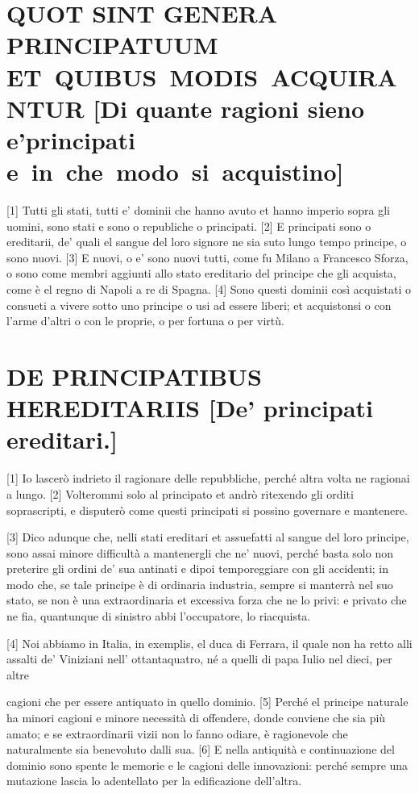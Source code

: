 \setcounter{secnumdepth}{2}

\quebra\section{QUOT SINT GENERA PRINCIPATUUM ET~QUIBUS~MODIS~ACQUIRANTUR\break
{[}Di quante ragioni sieno e'principati e~in~che~modo~si~acquistino{]}}

{[}1{]} Tutti gli stati, tutti e' dominii che hanno avuto et hanno
imperio sopra gli uomini, sono stati e sono o republiche o principati.
{[}2{]} E principati sono o ereditarii, de' quali el sangue del loro
signore ne sia suto lungo tempo principe, o sono nuovi. {[}3{]} E nuovi,
o e' sono nuovi tutti, come fu Milano a Francesco Sforza, o sono come
membri aggiunti allo stato ereditario del principe che gli acquista,
come è el regno di Napoli a re di Spagna. {[}4{]} Sono questi dominii
così acquistati o consueti a vivere sotto uno principe o usi ad essere
liberi; et acquistonsi o con l'arme d'altri o con le proprie, o per
fortuna o per virtù.

\quebra\section{DE PRINCIPATIBUS HEREDITARIIS
{[}De' principati ereditari.{]}}

{[}1{]} Io lascerò indrieto il ragionare delle repubbliche, perché altra
volta ne ragionai a lungo. {[}2{]} Volterommi solo al principato et
andrò ritexendo gli orditi soprascripti, e disputerò come questi
principati si possino governare e mantenere.

{[}3{]} Dico adunque che, nelli stati ereditari et assuefatti al sangue
del loro principe, sono assai minore difficultà a mantenergli che ne'
nuovi, perché basta solo non preterire gli ordini de' sua antinati e
dipoi temporeggiare con gli accidenti; in modo che, se tale principe è
di ordinaria industria, sempre si manterrà nel suo stato, se non è una
extraordinaria et excessiva forza che ne lo privi: e privato che ne fia,
quantunque di sinistro abbi l'occupatore, lo riacquista.

{[}4{]} Noi abbiamo in Italia, in exemplis, el duca di Ferrara, il quale
non ha retto alli assalti de' Viniziani nell' ottantaquatro, né a quelli
di papa Iulio nel dieci, per altre

cagioni che per essere antiquato in quello dominio. {[}5{]} Perché el
principe naturale ha minori cagioni e minore necessità di offendere,
donde conviene che sia più amato; e se extraordinarii vizii non lo fanno
odiare, è ragionevole che naturalmente sia benevoluto dalli sua. {[}6{]}
E nella antiquità e continuazione del dominio sono spente le memorie e
le cagioni delle innovazioni: perché sempre una mutazione lascia lo
adentellato per la edificazione dell'altra.


